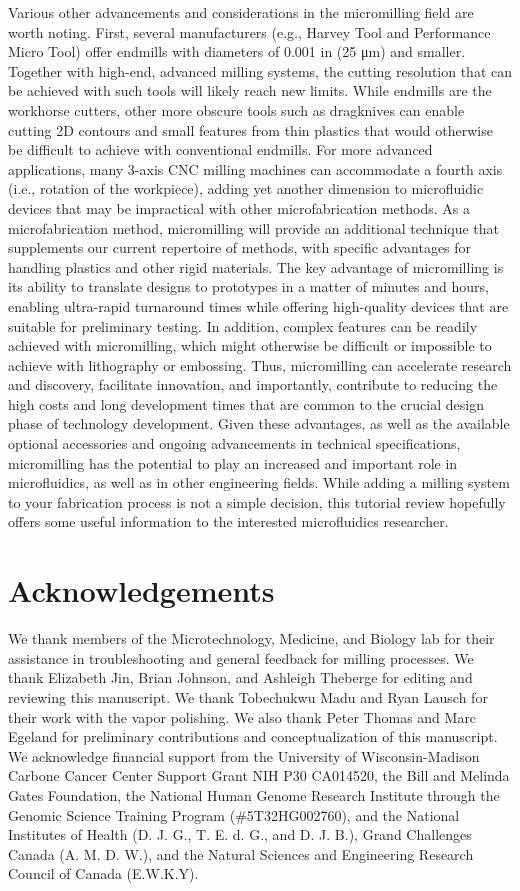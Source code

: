 Various other advancements and considerations in the micromilling field are worth noting. First, several manufacturers (e.g., Harvey Tool and Performance Micro Tool) offer endmills with diameters of 0.001 in (25 μm) and smaller. Together with high-end, advanced milling systems, the cutting resolution that can be achieved with such tools will likely reach new limits. While endmills are the workhorse cutters, other more obscure tools such as dragknives can enable cutting 2D contours and small features from thin plastics that would otherwise be difficult to achieve with conventional endmills. For more advanced applications, many 3-axis CNC milling machines can accommodate a fourth axis (i.e., rotation of the workpiece), adding yet another dimension to microfluidic devices that may be impractical with other microfabrication methods. 
As a microfabrication method, micromilling will provide an additional technique that supplements our current repertoire of methods, with specific advantages for handling plastics and other rigid materials. The key advantage of micromilling is its ability to translate designs to prototypes in a matter of minutes and hours, enabling ultra-rapid turnaround times while offering high-quality devices that are suitable for preliminary testing. In addition, complex features can be readily achieved with micromilling, which might otherwise be difficult or impossible to achieve with lithography or embossing. Thus, micromilling can accelerate research and discovery, facilitate innovation, and importantly, contribute to reducing the high costs and long development times that are common to the crucial design phase of technology development. Given these advantages, as well as the available optional accessories and ongoing advancements in technical specifications, micromilling has the potential to play an increased and important role in microfluidics, as well as in other engineering fields. While adding a milling system to your fabrication process is not a simple decision, this tutorial review hopefully offers some useful information to the interested microfluidics researcher.

\section{Acknowledgements}
We thank members of the Microtechnology, Medicine, and Biology lab for their assistance in troubleshooting and general feedback for milling processes. We thank Elizabeth Jin, Brian Johnson, and Ashleigh Theberge for editing and reviewing this manuscript. We thank Tobechukwu Madu and Ryan Lausch for their work with the vapor polishing. We also thank Peter Thomas and Marc Egeland for preliminary contributions and conceptualization of this manuscript. We acknowledge financial support from the University of Wisconsin-Madison Carbone Cancer Center Support Grant NIH P30 CA014520, the Bill and Melinda Gates Foundation, the National Human Genome Research Institute through the Genomic Science Training Program (\#5T32HG002760), and the National Institutes of Health (D. J. G., T. E. d. G., and D. J. B.), Grand Challenges Canada (A. M. D. W.), and the Natural Sciences and Engineering Research Council of Canada (E.W.K.Y).